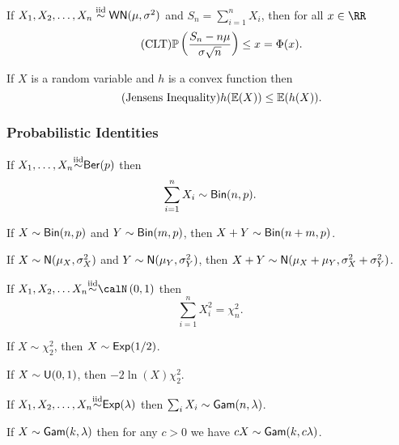 \vspace{1cm}

If $X_1 , X_2 , \ldots , X_n \overset{\text{iid}}{\sim} {\sf WN} (\mu,\sigma^2)$ and $S_n = \sum_{i=1}^{n} X_i$, then for all $x \in \RR$
\begin{equation}
    \tag{CLT} {\mathbb{P}} \left( \frac{S_n - n \mu}{\sigma \sqrt{n}} \right) \leq x = \Phi (x) .
\end{equation}

\vspace{1cm}

If $X$ is a random variable and $h$ is a convex function then
\begin{equation}
    \tag{Jensens Inequality} h({\mathbb{E}} (X)) \leq {\mathbb{E}} (h(X)).
\end{equation}

\subsubsection*{Probabilistic Identities}

If $X_1 , \ldots , X_n {\overset{\text{iid}}{\sim}} {\sf Ber}(p)$ then
\begin{equation}
    \sum_{i=1}^{n} X_i \sim {\sf Bin} (n,p).
\end{equation}

\vspace{1cm}

If $X \sim {\sf Bin} (n,p)$ and $Y \sim {\sf Bin} (m,p)$, then $X + Y \sim {\sf Bin} (n+m,p)$.

\vspace{1cm}

If $X \sim {\sf N} (\mu_X,\sigma^2_X)$ and $Y \sim {\sf N} (\mu_Y,\sigma^2_Y)$, then $X + Y \sim {\sf N} (\mu_X + \mu_Y,\sigma^2_X + \sigma^2_Y)$.

\vspace{1cm}

If $X_1 , X_2 , \ldots X_n \iid \calN \left( 0 , 1 \right)$ then
\begin{equation} \label{eqn: norm_chi_sq}
    \sum_{i=1}^{n} X_i^2 = \chi_n^2 .
\end{equation}

\vspace{1cm}

If $X \sim  \chi_2^2$, then $X \sim {\sf Exp} (1/2)$.

\vspace{1cm}

If $X \sim  {\sf U} (0,1)$, then $-2 \ln (X) \chi_2^2$.

\vspace{1cm}

If $X_1 , X_2 , \ldots , X_n {\overset{\text{iid}}{\sim}} {\sf Exp} (\lambda)$ then $\sum_i X_i \sim {\sf Gam} (n,\lambda)$.

\vspace{1cm}

If $X \sim {\sf Gam} (k,\lambda)$ then for any $c>0$ we have $cX \sim {\sf Gam} (k,c\lambda)$.